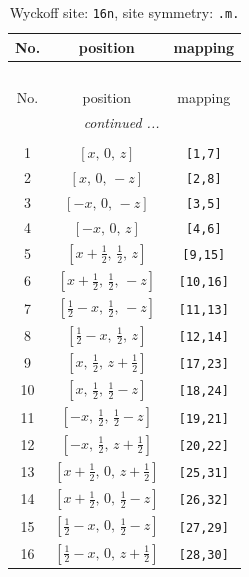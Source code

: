 \documentclass[fleqn,8pt]{jsarticle}
\begin{document}
\renewcommand{\arraystretch}{1.2}
\begin{longtable}{ccc}
\caption{Wyckoff site: {\tt 16n}, site symmetry: {\tt .m.}}
 \\
 \hline \hline
No. & position & mapping \\ \hline \endfirsthead

\multicolumn{2}{l}{\tablename\ \thetable{}} \\
 \hline \hline
No. & position & mapping \\ \hline \endhead

 \hline \hline
\multicolumn{2}{r}{\footnotesize\it continued ...} \\ \endfoot

 \hline \hline
\multicolumn{2}{r}{} \\ \endlastfoot

1 & $\left[ x,\, 0,\, z \right]$ & {\tt [1,7]} \\ \hline
2 & $\left[ x,\, 0,\, - z \right]$ & {\tt [2,8]} \\ \hline
3 & $\left[ - x,\, 0,\, - z \right]$ & {\tt [3,5]} \\ \hline
4 & $\left[ - x,\, 0,\, z \right]$ & {\tt [4,6]} \\ \hline
5 & $\left[ x + \frac{1}{2},\, \frac{1}{2},\, z \right]$ & {\tt [9,15]} \\ \hline
6 & $\left[ x + \frac{1}{2},\, \frac{1}{2},\, - z \right]$ & {\tt [10,16]} \\ \hline
7 & $\left[ \frac{1}{2} - x,\, \frac{1}{2},\, - z \right]$ & {\tt [11,13]} \\ \hline
8 & $\left[ \frac{1}{2} - x,\, \frac{1}{2},\, z \right]$ & {\tt [12,14]} \\ \hline
9 & $\left[ x,\, \frac{1}{2},\, z + \frac{1}{2} \right]$ & {\tt [17,23]} \\ \hline
10 & $\left[ x,\, \frac{1}{2},\, \frac{1}{2} - z \right]$ & {\tt [18,24]} \\ \hline
11 & $\left[ - x,\, \frac{1}{2},\, \frac{1}{2} - z \right]$ & {\tt [19,21]} \\ \hline
12 & $\left[ - x,\, \frac{1}{2},\, z + \frac{1}{2} \right]$ & {\tt [20,22]} \\ \hline
13 & $\left[ x + \frac{1}{2},\, 0,\, z + \frac{1}{2} \right]$ & {\tt [25,31]} \\ \hline
14 & $\left[ x + \frac{1}{2},\, 0,\, \frac{1}{2} - z \right]$ & {\tt [26,32]} \\ \hline
15 & $\left[ \frac{1}{2} - x,\, 0,\, \frac{1}{2} - z \right]$ & {\tt [27,29]} \\ \hline
16 & $\left[ \frac{1}{2} - x,\, 0,\, z + \frac{1}{2} \right]$ & {\tt [28,30]} \\
\end{longtable}
\end{document}

